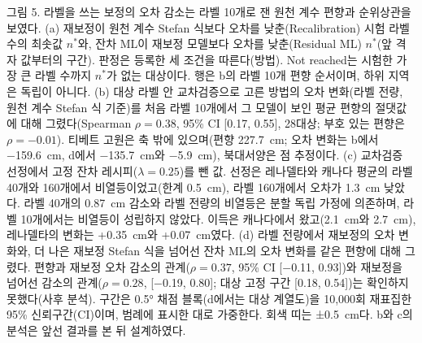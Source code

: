 \noindent 그림 5. 라벨을 쓰는 보정의 오차 감소는 라벨 10개로 잰 원천 계수 편향과 순위상관을 보였다.
(a) 재보정이 원천 계수 Stefan 식보다 오차를 낮춘(Recalibration) 시험 라벨 수의 최솟값 $n^{*}$와, 잔차 ML이 재보정 모델보다 오차를 낮춘(Residual ML) $n^{*}$(앞 격자 값부터의 구간). 판정은 등록한 세 조건을 따른다(방법). Not reached는 시험한 가장 큰 라벨 수까지 $n^{*}$가 없는 대상이다.
행은 b의 라벨 10개 편향 순서이며, 하위 지역은 독립이 아니다.
(b) 대상 라벨 안 교차검증으로 고른 방법의 오차 변화(라벨 전량, 원천 계수 Stefan 식 기준)를 처음 라벨 10개에서 그 모델이 보인 평균 편향의 절댓값에 대해 그렸다(Spearman $\rho = 0.38$, 95\% CI [0.17, 0.55], 28대상; 부호 있는 편향은 $\rho = -0.01$).
티베트 고원은 축 밖에 있으며(편향 227.7~cm; 오차 변화는 b에서 −159.6~cm, d에서 −135.7~cm와 −5.9~cm), 북대서양은 점 추정이다.
(c) 교차검증 선정에서 고정 잔차 레시피($\lambda = 0.25$)를 뺀 값.
선정은 레나델타와 캐나다 평균의 라벨 40개와 160개에서 비열등이었고(한계 0.5~cm), 라벨 160개에서 오차가 1.3~cm 낮았다. 라벨 40개의 0.87~cm 감소와 라벨 전량의 비열등은 분할 독립 가정에 의존하며, 라벨 10개에서는 비열등이 성립하지 않았다.
이득은 캐나다에서 왔고(2.1~cm와 2.7~cm), 레나델타의 변화는 +0.35~cm와 +0.07~cm였다.
(d) 라벨 전량에서 재보정의 오차 변화와, 더 나은 재보정 Stefan 식을 넘어선 잔차 ML의 오차 변화를 같은 편향에 대해 그렸다.
편향과 재보정 오차 감소의 관계($\rho = 0.37$, 95\% CI [−0.11, 0.93])와 재보정을 넘어선 감소의 관계($\rho = 0.28$, [−0.19, 0.80]; 대상 고정 구간 [0.18, 0.54])는 확인하지 못했다(사후 분석).
구간은 0.5° 채점 블록(d에서는 대상 계열도)을 10,000회 재표집한 95\% 신뢰구간(CI)이며, 범례에 표시한 대로 가중한다. 회색 띠는 ±0.5~cm다.
b와 c의 분석은 앞선 결과를 본 뒤 설계하였다.

\medskip

